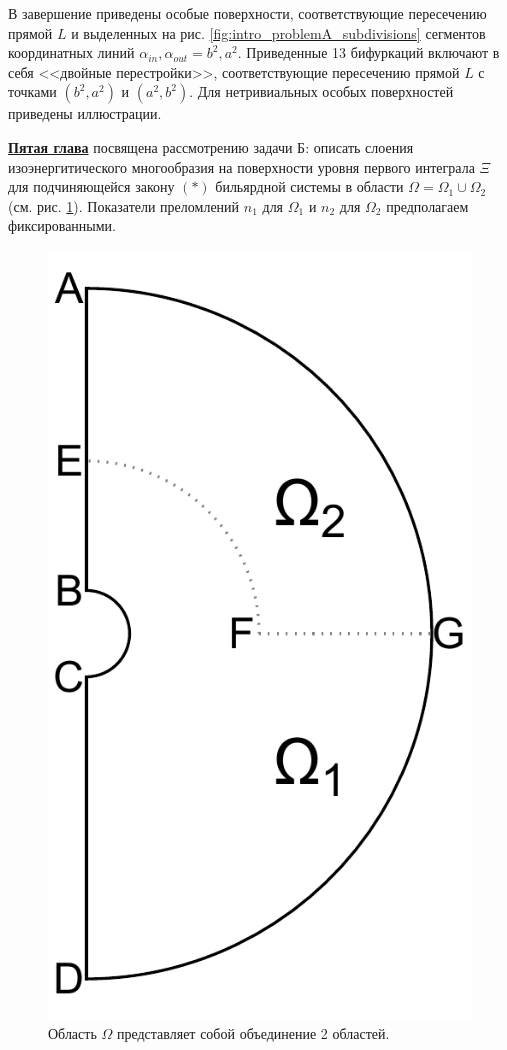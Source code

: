 В завершение приведены особые поверхности, соответствующие пересечению прямой $L$ и выделенных на рис. \ref{fig:intro_problemA_subdivisions} сегментов координатных линий $\alpha_{in}, \alpha_{out} = b^2, a^2$. Приведенные 13 бифуркаций включают в себя <<двойные перестройки>>, соответствующие пересечению прямой $L$ с точками  $(b^2, a^2)$ и $(a^2, b^2)$. Для нетривиальных особых поверхностей приведены иллюстрации.



\underline{\textbf{Пятая глава}} посвящена рассмотрению задачи Б: описать слоения изоэнергитического многообразия на поверхности уровня первого интеграла $\Xi$ для подчиняющейся закону $(\ast)$ бильярдной системы в области $\Omega = \Omega_1 \cup \Omega_2$ (см. рис. \ref{fig:intro_domain}). Показатели преломлений $n_1$ для $\Omega_1$ и $n_2$ для $\Omega_2$ предполагаем фиксированными.
\begin{figure}[!htb]
\centering
\includegraphics[scale=0.3]{images/ch4/section3_circular/domain.pdf}
    \caption{Область $\Omega$ представляет собой объединение 2 областей.}
    \label{fig:intro_domain}
\end{figure}
